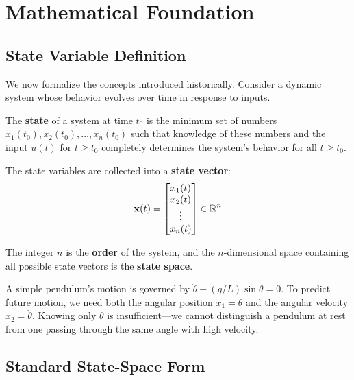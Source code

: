 \section{Mathematical Foundation}

\subsection{State Variable Definition}

We now formalize the concepts introduced historically. Consider a dynamic system whose behavior evolves over time in response to inputs.

\begin{definition}[State]
The \textbf{state} of a system at time $t_0$ is the minimum set of numbers $x_1(t_0), x_2(t_0), \ldots, x_n(t_0)$ such that knowledge of these numbers and the input $u(t)$ for $t \geq t_0$ completely determines the system's behavior for all $t \geq t_0$.
\end{definition}

The state variables are collected into a \textbf{state vector}:
\begin{equation}
    \mathbf{x}(t) = \begin{bmatrix} x_1(t) \\ x_2(t) \\ \vdots \\ x_n(t) \end{bmatrix} \in \mathbb{R}^n
\end{equation}

The integer $n$ is the \textbf{order} of the system, and the $n$-dimensional space containing all possible state vectors is the \textbf{state space}.

\begin{example}
A simple pendulum's motion is governed by $\ddot{\theta} + (g/L)\sin\theta = 0$. To predict future motion, we need both the angular position $x_1 = \theta$ and the angular velocity $x_2 = \dot{\theta}$. Knowing only $\theta$ is insufficient---we cannot distinguish a pendulum at rest from one passing through the same angle with high velocity.
\end{example}

\subsection{Standard State-Space Form}

